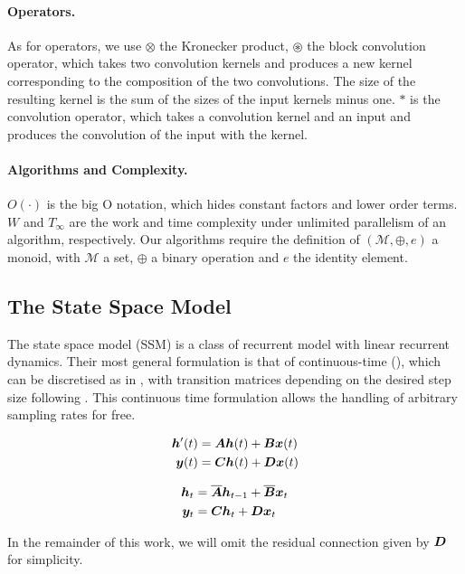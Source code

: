 \documentclass{article}
\begin{document}
\paragraph{Operators.} As for operators, we use $\otimes$ the Kronecker product, $\circledast$ the block convolution operator, which takes two convolution kernels and produces a new kernel corresponding to the composition of the two convolutions. The size of the resulting kernel is the sum of the sizes of the input kernels minus one. $\ast$ is the convolution operator, which takes a convolution kernel and an input and produces the convolution of the input with the kernel.
\paragraph{Algorithms and Complexity.} $O(\cdot)$ is the big O notation, which hides constant factors and lower order terms. $W$ and $T_\infty$ are the work and time complexity under unlimited parallelism of an algorithm, respectively. Our algorithms require the definition of $(\mathcal{M}, \oplus, e)$ a monoid, with $\mathcal{M}$ a set, $\oplus$ a binary operation and $e$ the identity element.
\subsection{The State Space Model}
The state space model (SSM) is a class of recurrent model with linear recurrent dynamics. Their most general formulation is that of continuous-time (), which can be discretised as in , with transition matrices depending on the desired step size following . This continuous time formulation allows the handling of arbitrary sampling rates for free.
\begin{minipage}[t]{.45\linewidth}
  \begin{subequations}
    \label{eq:ssm}
    \begin{align}
      \bm{h}'(t) &= \bm{A} \bm{h}(t) + \bm{B} \bm{x}(t) \\
      \bm{y}(t) &= \bm{C} \bm{h}(t) + \bm{D} \bm{x}(t)
    \end{align}
  \end{subequations}
\end{minipage}%
\begin{minipage}[t]{.45\linewidth}
  \begin{subequations}
    \label{eq:ssm:recurrence}
    \begin{align}
    \label{eq:ssm:recurrence:1}
      \bm{h}_{t} &= \overline{\bm{A}} \bm{h}_{t-1} + \overline{\bm{B}} \bm{x}_t \\
    \label{eq:ssm:recurrence:2}
      \bm{y}_t &= \bm{C} \bm{h}_t + \bm{D} \bm{x}_t
    \end{align}
  \end{subequations}
\end{minipage}%
In the remainder of this work, we will omit the residual connection given by $\bm{D}$ for simplicity.
\end{document}

